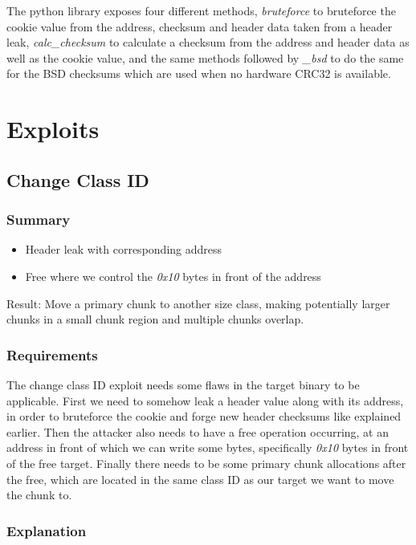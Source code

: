 \documentclass[a4paper,11pt,oneside]{report}
\begin{document}
The python library exposes four different methods, \emph{bruteforce} to bruteforce the
cookie value from the address, checksum and header data taken from a header leak,
\emph{calc\_checksum} to calculate a checksum from the address and header data as well as
the cookie value, and the same methods followed by \emph{\_bsd} to do the same for the BSD
checksums which are used when no hardware CRC32 is available.


\chapter{Exploits}

\section{Change Class ID}

\subsection{Summary}

\begin{itemize}
\item Header leak with corresponding address
\item Free where we control the \emph{0x10} bytes in front of the address
\end{itemize}

Result: Move a primary chunk to another size class, making potentially larger chunks in a
small chunk region and multiple chunks overlap.

\subsection{Requirements}

The change class ID exploit needs some flaws in the target binary to be applicable.  First
we need to somehow leak a header value along with its address, in order to bruteforce the
cookie and forge new header checksums like explained earlier. Then the attacker also needs
to have a free operation occurring, at an address in front of which we can write some
bytes, specifically \emph{0x10} bytes in front of the free target. Finally there needs to
be some primary chunk allocations after the free, which are located in the same class ID
as our target we want to move the chunk to.

\subsection{Explanation}
\end{document}
